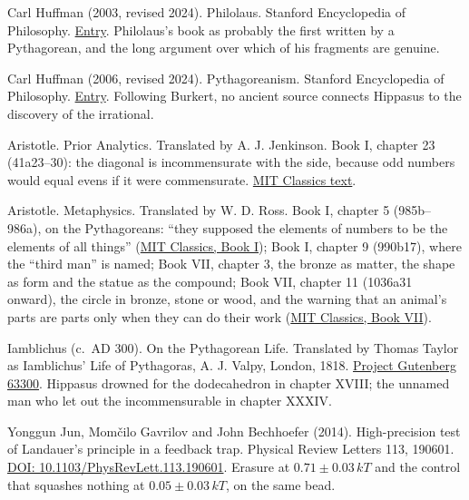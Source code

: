 \noindent Carl Huffman (2003, revised 2024). Philolaus. Stanford Encyclopedia of Philosophy. \href{https://plato.stanford.edu/entries/philolaus/}{Entry}. Philolaus's book as probably the first written by a Pythagorean, and the long argument over which of his fragments are genuine.
\par\medskip

\noindent Carl Huffman (2006, revised 2024). Pythagoreanism. Stanford Encyclopedia of Philosophy. \href{https://plato.stanford.edu/entries/pythagoreanism/}{Entry}. Following Burkert, no ancient source connects Hippasus to the discovery of the irrational.
\par\medskip

\noindent Aristotle. Prior Analytics. Translated by A. J. Jenkinson. Book I, chapter 23 (41a23--30): the diagonal is incommensurate with the side, because odd numbers would equal evens if it were commensurate. \href{http://classics.mit.edu/Aristotle/prior.mb.txt}{MIT Classics text}.
\par\medskip

\noindent Aristotle. Metaphysics. Translated by W. D. Ross. Book I, chapter 5 (985b--986a), on the Pythagoreans: ``they supposed the elements of numbers to be the elements of all things'' (\href{http://classics.mit.edu/Aristotle/metaphysics.1.i.html}{MIT Classics, Book I}); Book I, chapter 9 (990b17), where the ``third man'' is named; Book VII, chapter 3, the bronze as matter, the shape as form and the statue as the compound; Book VII, chapter 11 (1036a31 onward), the circle in bronze, stone or wood, and the warning that an animal's parts are parts only when they can do their work (\href{http://classics.mit.edu/Aristotle/metaphysics.7.vii.html}{MIT Classics, Book VII}).
\par\medskip

\noindent Iamblichus (c.\ AD 300). On the Pythagorean Life. Translated by Thomas Taylor as Iamblichus' Life of Pythagoras, A. J. Valpy, London, 1818. \href{https://www.gutenberg.org/ebooks/63300}{Project Gutenberg 63300}. Hippasus drowned for the dodecahedron in chapter XVIII; the unnamed man who let out the incommensurable in chapter XXXIV.
\par\medskip

\noindent Yonggun Jun, Mom\v{c}ilo Gavrilov and John Bechhoefer (2014). High-precision test of Landauer's principle in a feedback trap. Physical Review Letters 113, 190601. \href{https://doi.org/10.1103/PhysRevLett.113.190601}{DOI: 10.1103/PhysRevLett.113.190601}. Erasure at $0.71 \pm 0.03\,kT$ and the control that squashes nothing at $0.05 \pm 0.03\,kT$, on the same bead.
\par\medskip

